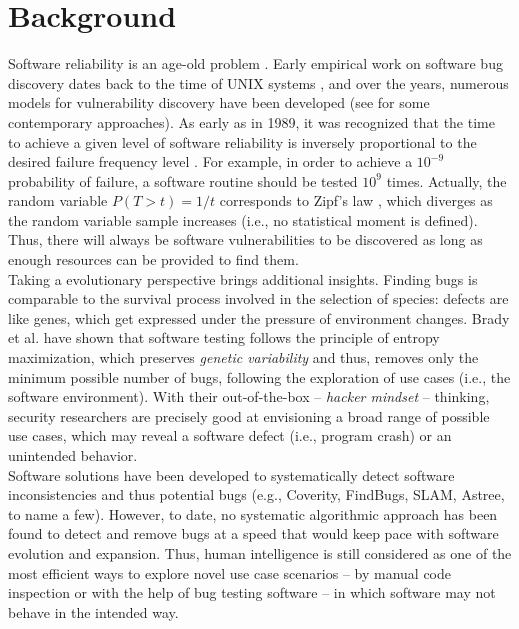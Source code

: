 \section{Background}
\label{sec:related}

Software reliability is an age-old problem \cite{littlewood1973bayesian,adams1984textordfeminineoptimizing,littlewood1989predicting}. Early empirical work on software bug discovery dates back to the time of UNIX systems \cite{miller1990empirical}, and over the years, numerous models for vulnerability discovery have been developed (see \cite{avgerinos2014enhancing,zhao2016empirical} for some contemporary approaches). As early as in 1989, it was recognized that the time to achieve a given level of software reliability is inversely proportional to the desired failure frequency level \cite{adams1984textordfeminineoptimizing}. For example, in order to achieve a $10^{-9}$ probability of failure, a software routine should be tested $10^{9}$ times. Actually, the random variable $P(T > t) = 1/t$ corresponds to Zipf's law \cite{maillart2008empirical,saichev2009theory}, which diverges as the random variable sample increases (i.e., no statistical moment is defined). Thus, there will always be software vulnerabilities to be discovered as long as enough resources can be provided to find them.\\

Taking a evolutionary perspective brings additional insights. Finding bugs is comparable to the survival process involved in the selection of species: defects are like genes, which get expressed under the pressure of environment changes. Brady et al. \cite{brady1999murphy} have shown that software testing follows the principle of entropy maximization, which preserves {\it genetic variability} and thus, removes only the minimum possible number of bugs, following the exploration of use cases (i.e., the software environment). With their out-of-the-box -- {\it hacker mindset} -- thinking, security researchers are precisely good at envisioning a broad range of possible use cases, which may reveal a software defect (i.e., program crash) or an unintended behavior.\\

Software solutions have been developed to systematically detect software inconsistencies and thus potential bugs (e.g., Coverity, FindBugs, SLAM, Astree, to name a few). However, to date, no systematic algorithmic approach has been found to detect and remove bugs at a speed that would keep pace with software evolution and expansion. Thus, human intelligence is still considered as one of the most efficient ways to explore novel use case scenarios -- by manual code inspection or with the help of bug testing software -- in which software may not behave in the intended way.\\

